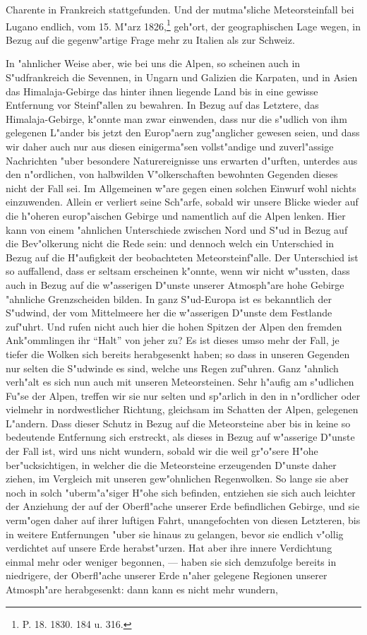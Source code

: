 \documentclass[a4paper, 8pt, oneside, polutonikogreek, german]{article}
\begin{document}
Charente in Frankreich stattgefunden. Und der mutma"sliche Meteorsteinfall bei Lugano endlich, vom 15. M"arz 1826,\footnote{P. 18. 1830. 184 u. 316.} geh"ort, der geographischen Lage wegen, in Bezug auf die gegenw"artige Frage mehr zu Italien als zur Schweiz.

In "ahnlicher Weise aber, wie bei uns die Alpen, so scheinen auch in S"udfrankreich die Sevennen, in Ungarn und Galizien die Karpaten, und in Asien das Himalaja-Gebirge das hinter ihnen liegende Land bis in eine gewisse Entfernung vor Steinf"allen zu bewahren. In Bezug auf das Letztere, das Himalaja-Gebirge, k"onnte man zwar einwenden, dass nur die s"udlich von ihm gelegenen L"ander bis jetzt den Europ"aern zug"anglicher gewesen seien, und dass wir daher auch nur aus diesen einigerma"sen vollst"andige und zuverl"assige Nachrichten "uber besondere Naturereignisse uns erwarten d"urften, unterdes aus den n"ordlichen, von halbwilden V"olkerschaften bewohnten Gegenden dieses nicht der Fall sei. Im Allgemeinen w"are gegen einen solchen Einwurf wohl nichts einzuwenden. Allein er verliert seine Sch"arfe, sobald wir unsere Blicke wieder auf die h"oheren europ"aischen Gebirge und namentlich auf die Alpen lenken. Hier kann von einem "ahnlichen Unterschiede zwischen Nord und S"ud in Bezug auf die Bev"olkerung nicht die Rede sein: und dennoch welch ein Unterschied in Bezug auf die H"aufigkeit der beobachteten Meteorsteinf"alle. Der Unterschied ist so auffallend, dass er seltsam erscheinen k"onnte, wenn wir nicht w"ussten, dass auch in Bezug auf die w"asserigen D"unste unserer Atmosph"are hohe Gebirge "ahnliche Grenzscheiden bilden. In ganz S"ud-Europa ist es bekanntlich der S"udwind, der vom Mittelmeere her die w"asserigen D"unste dem Festlande zuf"uhrt. Und rufen nicht auch hier die hohen Spitzen der Alpen den fremden Ank"ommlingen ihr "`Halt"' von jeher zu? Es ist dieses umso mehr der Fall, je tiefer die Wolken sich bereits herabgesenkt haben; so dass in unseren Gegenden nur selten die S"udwinde es sind, welche uns Regen zuf"uhren. Ganz "ahnlich verh"alt es sich nun auch mit unseren Meteorsteinen. Sehr h"aufig am s"udlichen Fu"se der Alpen, treffen wir sie nur selten und sp"arlich in den in n"ordlicher oder vielmehr in nordwestlicher Richtung, gleichsam im Schatten der Alpen, gelegenen L"andern. Dass dieser Schutz in Bezug auf die Meteorsteine aber bis in keine so bedeutende Entfernung sich erstreckt, als dieses in Bezug auf w"asserige D"unste der Fall ist, wird uns nicht wundern, sobald wir die weil gr"o"sere H"ohe ber"ucksichtigen, in welcher die die Meteorsteine erzeugenden D"unste daher ziehen, im Vergleich mit unseren gew"ohnlichen Regenwolken. So lange sie aber noch in solch "uberm"a"siger H"ohe sich befinden, entziehen sie sich auch leichter der Anziehung der auf der Oberfl"ache unserer Erde befindlichen Gebirge, und sie verm"ogen daher auf ihrer luftigen Fahrt, unangefochten von diesen Letzteren, bis in weitere Entfernungen "uber sie hinaus zu gelangen, bevor sie endlich v"ollig verdichtet auf unsere Erde herabst"urzen. Hat aber ihre innere Verdichtung einmal mehr oder weniger begonnen, --- haben sie sich demzufolge bereits in niedrigere, der Oberfl"ache unserer Erde n"aher gelegene Regionen unserer Atmosph"are herabgesenkt: dann kann es nicht mehr wundern, 
\end{document}
